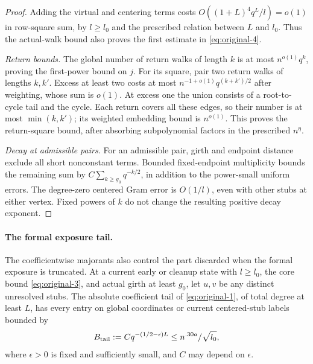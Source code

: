 \begin{proof}
Adding the virtual and centering terms costs
$O((1+L)^4q^L/l)=o(1)$ in row-square sum, by $l\ge l_0$ and the
prescribed relation between $L$ and $l_0$. Thus the actual-walk bound
also proves the first estimate in \eqref{eq:original-4}.

\emph{Return bounds.}
The global number of return walks of length $k$ is at most
$n^{o(1)}q^k$, proving the first-power bound on $j$. For its square,
pair two return walks of lengths $k,k'$. Excess at least two costs at
most $n^{-1+o(1)}q^{(k+k')/2}$ after weighting, whose sum is $o(1)$.
At excess one the union consists of a root-to-cycle tail and the
cycle. Each return covers all these edges, so their number is at most
$\min(k,k')$; its weighted embedding bound is $n^{o(1)}$. This proves
the return-square bound, after absorbing subpolynomial factors in the
prescribed $n^\eta$.

\emph{Decay at admissible pairs.}
For an admissible pair, girth and endpoint distance exclude all short
nonconstant terms. Bounded fixed-endpoint multiplicity bounds the
remaining sum by $C\sum_{k\ge g_0}q^{-k/2}$, in addition to the
power-small uniform errors. The degree-zero centered Gram error is
$O(1/l)$, even with other stubs at either vertex. Fixed powers of $k$
do not change the resulting positive decay exponent.
\end{proof}

\paragraph{The formal exposure tail.}
The coefficientwise majorants also control the part discarded when
the formal exposure is truncated. At a current early or cleanup state
with $l\ge l_0$, the core bound \eqref{eq:original-3}, and actual girth
at least $g_0$, let $u,v$ be any distinct unresolved stubs. The absolute
coefficient tail of \eqref{eq:original-1}, of total degree at least $L$,
has every entry on global coordinates or current centered-stub labels
bounded by
\begin{equation}
 B_{\rm tail}:=Cq^{-(1/2-\epsilon)L}
       \le n^{.30a}/\sqrt{l_0},
 \label{eq:original-6}
\end{equation}
where $\epsilon>0$ is fixed and sufficiently small, and $C$ may depend
on $\epsilon$.

